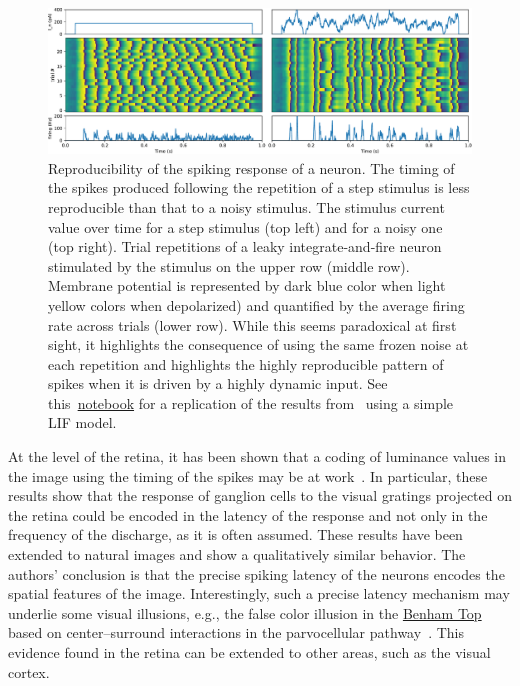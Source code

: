 \documentclass[brainsci, %
               review,accept,pdftex,moreauthors
               ]{Definitions/mdpi}
\begin{document}
\begin{figure}[H]
\includegraphics[width=\textwidth]{figures/replicating_MainenSejnowski1995.pdf} 
\caption{
  Reproducibility of the spiking response of a neuron. 
The timing of the spikes produced following the repetition of a step stimulus is less reproducible than that to a noisy stimulus. The stimulus current value over time for a step stimulus (top left) and for a noisy one (top right). Trial repetitions of a leaky integrate-and-fire neuron stimulated by the stimulus on the upper row (middle row). Membrane potential is represented by dark blue color when light yellow colors when depolarized) and quantified by the average firing rate across trials (lower row). While this seems paradoxical at first sight, it highlights the consequence of using the same frozen noise at each repetition and highlights the highly reproducible pattern of spikes when it is driven by a highly dynamic input. See this~\href{https://github.com/laurentperrinet/2022_UE-neurosciences-computationnelles/blob/master/C_MainenSejnowski1995_Perrinet.ipynb}{notebook} %
for a replication of the results from~\citep{mainen_reliability_1995} using a simple LIF model.}\label{fig:mainen}
\end{figure}

 At the level of the retina, it has been shown that a coding of luminance values in the image using the timing of the spikes may be at work~\citep{gollisch_rapid_2008}. In particular, these results show that the response of ganglion cells to the visual gratings projected on the retina could be encoded in the latency of the response and not only in the frequency of the discharge, as it is often assumed. These results have been extended to natural images and show a qualitatively similar behavior. The authors' conclusion is that the precise spiking latency of the neurons encodes the spatial features of the image. Interestingly, such a precise latency mechanism may underlie some visual illusions, e.g., the false color illusion in the \href{https://michaelbach.de/ot/col-Benham/index.html}{Benham Top} based on center--surround interactions in the parvocellular pathway~\citep{kenyon_theory_2004}. This evidence found in the retina can be extended to other areas, such as the visual cortex.
\end{document}
